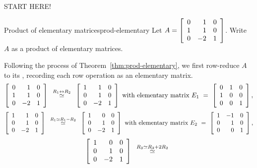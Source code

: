 \documentclass{ximera}
\begin{document}
START HERE!

\begin{example}{Product of elementary matrices}{prod-elementary}
  Let $A = \startmat{rrr}
    0 &  1 & 0 \\
    1 &  1 & 0 \\
    0 & -2 & 1
  \stopmat$.
  Write $A$ as a product of elementary matrices.
\end{example}

\begin{solution}
  Following the process of Theorem~\ref{thm:prod-elementary}, we first
  row-reduce $A$ to its {\rref}, recording each row operation as an
  elementary matrix.
  \begin{equation*}
    \startmat{rrr}
      0 & 1 & 0 \\
      1 & 1 & 0 \\
      0 & -2 & 1 \\
    \stopmat
    \quad\stackrel{R_1\rowswap R_2}{\roweq}\quad
    \startmat{rrr}
      1 & 1 & 0 \\
      0 & 1 & 0 \\
      0 & -2 & 1 \\
    \stopmat
    \quad\mbox{with elementary matrix}\quad
    E_1 ~=~ \startmat{rrr}
      0 & 1 & 0 \\
      1 & 0 & 0 \\
      0 & 0 & 1
    \stopmat,
  \end{equation*}
  \begin{equation*}
    \startmat{rrr}
      1 & 1 & 0 \\
      0 & 1 & 0 \\
      0 & -2 & 1 \\
    \stopmat
    \quad\stackrel{R_1\rowop R_1-R_2}{\roweq}\quad
    \startmat{rrr}
      1 & 0 & 0 \\
      0 & 1 & 0 \\
      0 & -2 & 1 \\
    \stopmat
    \quad\mbox{with elementary matrix}\quad
    E_2 ~=~  \startmat{rrr}
      1 & -1 & 0 \\
      0 & 1 & 0 \\
      0 & 0 & 1
    \stopmat,
  \end{equation*}
  \begin{equation*}
    \startmat{rrr}
      1 & 0 & 0 \\
      0 & 1 & 0 \\
      0 & -2 & 1 \\
    \stopmat
    \quad\stackrel{R_3\rowop R_3+2R_2}{\roweq}\quad

\end{equation*}
\end{solution}
\end{document}
